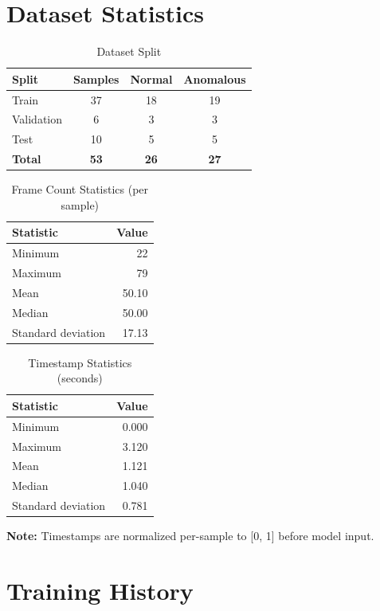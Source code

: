 \documentclass[11pt,a4paper]{article}
\begin{document}
\section{Dataset Statistics}

\begin{table}[H]
\centering
\caption{Dataset Split}
\begin{tabular}{lccc}
\toprule
\textbf{Split} & \textbf{Samples} & \textbf{Normal} & \textbf{Anomalous} \\
\midrule
Train & 37 & 18 & 19 \\
Validation & 6 & 3 & 3 \\
Test & 10 & 5 & 5 \\
\textbf{Total} & \textbf{53} & \textbf{26} & \textbf{27} \\
\bottomrule
\end{tabular}
\end{table}

\begin{table}[H]
\centering
\caption{Frame Count Statistics (per sample)}
\begin{tabular}{lr}
\toprule
\textbf{Statistic} & \textbf{Value} \\
\midrule
Minimum & 22 \\
Maximum & 79 \\
Mean & 50.10 \\
Median & 50.00 \\
Standard deviation & 17.13 \\
\bottomrule
\end{tabular}
\end{table}

\begin{table}[H]
\centering
\caption{Timestamp Statistics (seconds)}
\begin{tabular}{lr}
\toprule
\textbf{Statistic} & \textbf{Value} \\
\midrule
Minimum & 0.000 \\
Maximum & 3.120 \\
Mean & 1.121 \\
Median & 1.040 \\
Standard deviation & 0.781 \\
\bottomrule
\end{tabular}
\end{table}

\textbf{Note:} Timestamps are normalized per-sample to [0, 1] before model input.

\section{Training History}
\end{document}
